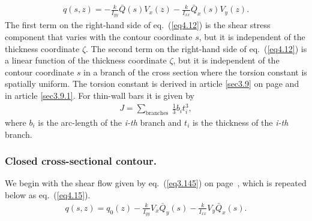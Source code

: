 \documentclass{AeroStructure-ERJohnson}
\begin{document}
\begin{align}\label{eq4.13}
q(s, z)=-\frac{k}{I_{y y}} \bar{Q}(s) V_{x}(z)-\frac{k}{I_{x x}} \bar{Q}_{x}(s) V_{y}(z).
\end{align}
The first term on the right-hand side of eq.~(\ref{eq4.12}) is the shear stress component that varies with the contour coordinate $s$, but it is independent of the thickness coordinate $\zeta$. The second term on the right-hand side of eq.~(\ref{eq4.12}) is a linear function of the thickness coordinate $\zeta$, but it is independent of the contour coordinate $s$ in a branch of the cross section where the torsion constant is spatially uniform. The torsion constant is derived in article \ref{sec3.9} on page \pageref{sec3.9} and in article \ref{sec3.9.1}. For thin-wall bars it is given by
\begin{align}\label{eq4.14}
J=\sum_{\textrm{branches }} \frac{1}{3} b_{i} t_{i}^{3},
\end{align}
where $b_{i}$ is the arc-length of the \textit{i-th} branch and $t_{i}$ is the thickness of the \textit{i-th} branch.

\subsubsection*{Closed cross-sectional contour.} We begin with the shear flow given by eq.~(\ref{eq3.145}) on page~\pageref{eq3.145}, which is repeated below as eq.~(\ref{eq4.15}).
\begin{align}\label{eq4.15}
q(s, z)=q_{0}(z)-\frac{k}{I_{y y}} V_{x} \bar{Q}_{y}(s)-\frac{k}{I_{x x}} V_{y} \bar{Q}_{x}(s).
\end{align}\vspace*{3pt}
\clearpage
\end{document}
